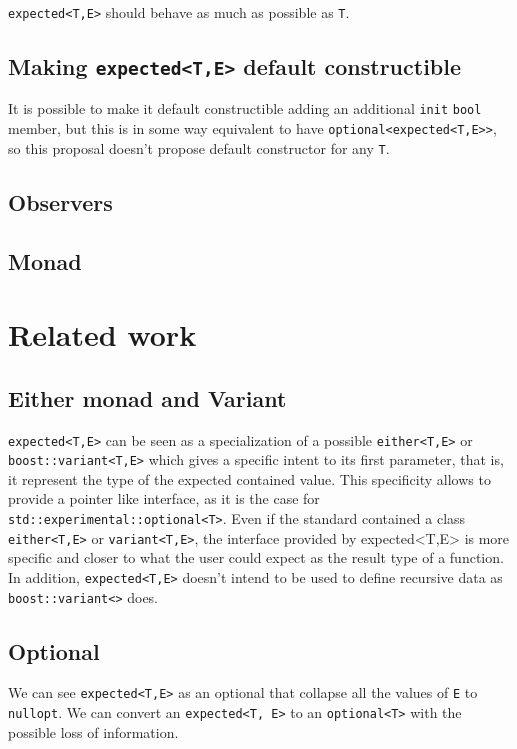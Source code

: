 \documentclass[a4paper,10pt]{article}
\newcommand{\cpp}[1]{\lstinline{#1}}
\begin{document}
\cpp{expected<T,E>} should behave as much as possible as \cpp{T}. 

\subsection{Making \cpp{expected<T,E>} default constructible}
It is possible to make it default constructible adding an additional \cpp{init} \cpp{bool} member, but this is in some way equivalent to have \cpp{optional<expected<T,E>>}, so this proposal doesn't propose default constructor for any \cpp{T}.

\subsection{Observers}


\subsection{Monad}


\section{Related work}

\subsection{Either monad and Variant}

\cpp{expected<T,E>} can be seen as a specialization of a possible \cpp{either<T,E>} or \cpp{boost::variant<T,E>} which gives a specific intent to its first parameter, that is, it represent the type of the expected contained value. This specificity allows to provide a pointer like interface, as it is the case for \cpp{std::experimental::optional<T>}. Even if the standard contained a class \cpp{either<T,E>} or \cpp{variant<T,E>}, the interface provided by expected<T,E> is more specific and closer to what the user could expect as the result type of a function. In addition, \cpp{expected<T,E>} doesn't intend to be used to define recursive data as \cpp{boost::variant<>} does.

\subsection{Optional}

We can see \cpp{expected<T,E>} as an optional that collapse all the values of \cpp{E} to \cpp{nullopt}. We can convert an \cpp{expected<T, E>} to an \cpp{optional<T>} with the possible loss of information.
\end{document}
